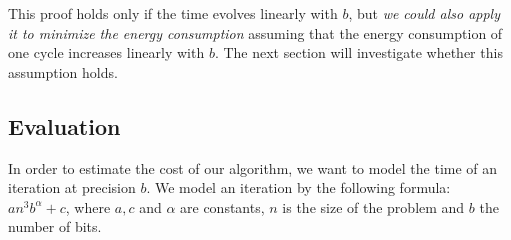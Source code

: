 \documentclass[10pt,conference]{IEEEtran}
\begin{document}
   This proof holds only if the time evolves linearly with $b$, but \textit{we could also apply it to minimize the energy consumption} assuming that the energy consumption of one cycle increases linearly with $b$. The next section will investigate whether
   this assumption holds.
   
   \subsection{Evaluation}
   
   In order to estimate the cost of our algorithm, we want to model the time of an iteration at precision $b$. We model an iteration by the following formula: $an^3b^\alpha+c$, where $a,c$ and $\alpha$ are constants,
   $n$ is the size of the problem and $b$ the number of bits.
   
\end{document}
